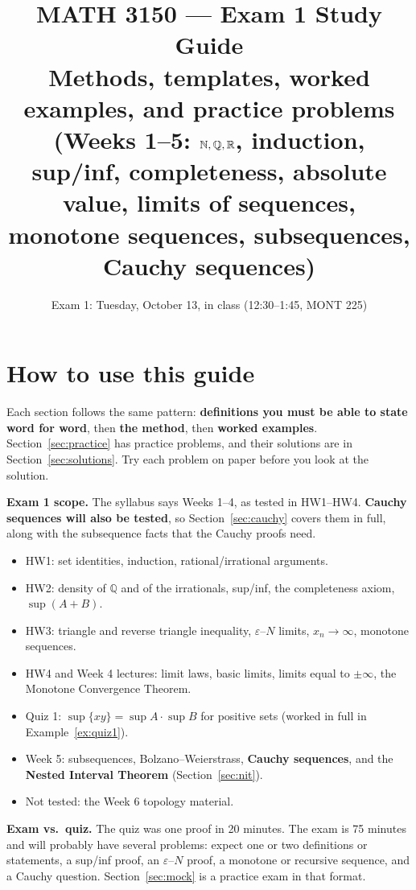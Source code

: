 \documentclass[11pt]{article}
\title{MATH 3150 --- Exam 1 Study Guide\\
\large Methods, templates, worked examples, and practice problems\\
\normalsize (Weeks 1--5: $\N,\Q,\R$, induction, sup/inf, completeness,
absolute value, limits of sequences, monotone sequences, subsequences,
Cauchy sequences)}
\author{}
\date{Exam 1: Tuesday, October 13, in class (12:30--1:45, MONT 225)}
\theoremstyle{definition}
\newcommand{\Q}{\mathbb{Q}}
\newcommand{\eps}{\varepsilon}
\newcommand{\key}[1]{\textcolor{red!70!black}{\textbf{#1}}}
\begin{document}
\maketitle
\tableofcontents
\newpage

\section{How to use this guide}

Each section follows the same pattern: \textbf{definitions you must be able
to state word for word}, then \textbf{the method}, then \textbf{worked
examples}. Section~\ref{sec:practice} has practice problems, and their
solutions are in Section~\ref{sec:solutions}. Try each problem on paper
before you look at the solution.

\medskip
\noindent\key{Exam 1 scope.} The syllabus says Weeks 1--4, as tested in
HW1--HW4. \textbf{Cauchy sequences will also be tested}, so
Section~\ref{sec:cauchy} covers them in full, along with the subsequence
facts that the Cauchy proofs need.
\begin{itemize}[nosep]
  \item HW1: set identities, induction, rational/irrational arguments.
  \item HW2: density of $\Q$ and of the irrationals, sup/inf, the
        completeness axiom, $\sup(A+B)$.
  \item HW3: triangle and reverse triangle inequality, $\eps$--$N$ limits,
        $x_n\to\infty$, monotone sequences.
  \item HW4 and Week 4 lectures: limit laws, basic limits, limits equal to
        $\pm\infty$, the Monotone Convergence Theorem.
  \item Quiz 1: $\sup\{xy\}=\sup A\cdot\sup B$ for positive sets
        (worked in full in Example~\ref{ex:quiz1}).
  \item Week 5: subsequences, Bolzano--Weierstrass, \textbf{Cauchy
        sequences}, and the \textbf{Nested Interval Theorem}
        (Section~\ref{sec:nit}).
  \item Not tested: the Week 6 topology material.
\end{itemize}

\medskip
\noindent\key{Exam vs.\ quiz.} The quiz was one proof in 20 minutes. The
exam is 75 minutes and will probably have several problems: expect one
or two definitions or statements, a sup/inf proof, an $\eps$--$N$ proof,
a monotone or recursive sequence, and a Cauchy question.
Section~\ref{sec:mock} is a practice exam in that format.
\end{document}
